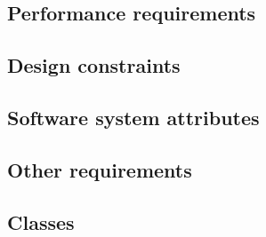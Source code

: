 

\subsection{Performance requirements}


\subsection{Design constraints}


\subsection{Software system attributes}


\subsection{Other requirements}


\subsection{Classes}
\lstset{language=C++} %

\subsubsection{\code{\cs/}}


